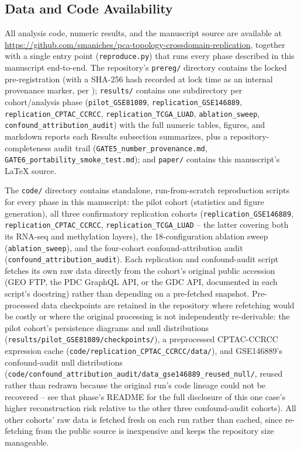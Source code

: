 \subsection*{Data and Code Availability}

All analysis code, numeric results, and the manuscript source are available at
\url{https://github.com/smaniches/pca-topology-crossdomain-replication}, together with a single entry
point (\texttt{reproduce.py}) that runs every phase described in this manuscript end-to-end. The
repository's \texttt{prereg/} directory contains the locked pre-registration (with a SHA-256 hash recorded
at lock time as an internal provenance marker, per ); \texttt{results/} contains one
subdirectory per cohort/analysis phase (\texttt{pilot\allowbreak\_GSE81089}, \texttt{replication\allowbreak\_GSE146889},
\texttt{replication\allowbreak\_CPTAC\allowbreak\_CCRCC}, \texttt{replication\allowbreak\_TCGA\allowbreak\_LUAD}, \texttt{ablation\allowbreak\_sweep},
\texttt{confound\allowbreak\_attribution\allowbreak\_audit}) with the full numeric tables, figures, and markdown reports each
Results subsection summarizes, plus a repository-completeness audit trail
(\texttt{GATE5\allowbreak\_number\allowbreak\_provenance.md}, \texttt{GATE6\allowbreak\_portability\allowbreak\_smoke\allowbreak\_test.md}); and
\texttt{paper/} contains this manuscript's LaTeX source.

The \texttt{code/} directory contains standalone, run-from-scratch reproduction scripts for every phase in
this manuscript: the pilot cohort (statistics and figure generation), all three confirmatory replication
cohorts (\texttt{replication\allowbreak\_GSE146889}, \texttt{replication\allowbreak\_CPTAC\allowbreak\_CCRCC},
\texttt{replication\allowbreak\_TCGA\allowbreak\_LUAD} -- the latter covering both its RNA-seq and methylation layers), the
18-configuration ablation sweep (\texttt{ablation\allowbreak\_sweep}), and the four-cohort confound-attribution audit
(\texttt{confound\allowbreak\_attribution\allowbreak\_audit}). Each replication and confound-audit script fetches its own raw
data directly from the cohort's original public accession (GEO FTP, the PDC GraphQL API, or the GDC API,
documented in each script's docstring) rather than depending on a pre-fetched snapshot. Pre-processed data
checkpoints are retained in the repository where refetching would be costly or where the original processing
is not independently re-derivable: the pilot cohort's persistence diagrams and null distributions
(\texttt{results/pilot\allowbreak\_GSE81089/checkpoints/}), a preprocessed CPTAC-CCRCC expression cache
(\texttt{code/replication\allowbreak\_CPTAC\allowbreak\_CCRCC/data/}), and GSE146889's confound-audit null distributions
(\texttt{code/confound\allowbreak\_attribution\allowbreak\_audit/data\allowbreak\_gse146889\allowbreak\_reused\allowbreak\_null/}, reused rather than
redrawn because the original run's code lineage could not be recovered -- see that phase's README for the
full disclosure of this one case's higher reconstruction risk relative to the other three confound-audit
cohorts). All other cohorts' raw data is fetched fresh on each run rather than cached, since re-fetching from
the public source is inexpensive and keeps the repository size manageable.

